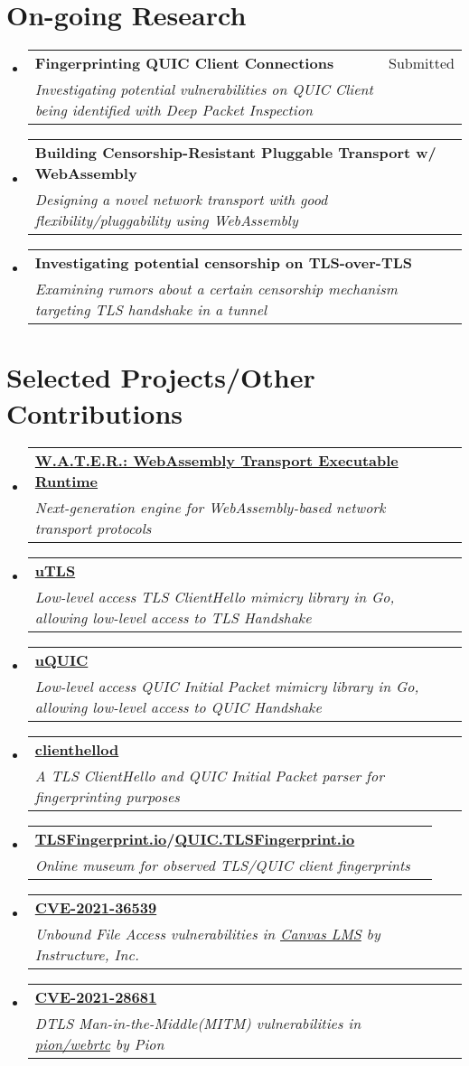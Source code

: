\documentclass[letterpaper,11pt]{article}
\makeatletter
\newcommand{\resumeSubheading}[4]{
  \vspace{-2pt}\item
    \begin{tabular*}{0.97\textwidth}[t]{l@{\extracolsep{\fill}}r}
      \textbf{#1} & #2 \\
      \textit{\small#3} & \textit{\small #4} \\
    \end{tabular*}\vspace{-7pt}
}
\newcommand{\resumeSubHeadingListStart}{\begin{itemize}[leftmargin=0.15in, label={}]}
\newcommand{\resumeSubHeadingListEnd}{\end{itemize}}
\makeatother
\begin{document}
\section{On-going Research}
\resumeSubHeadingListStart
  \resumeSubheading
  {\textbf{Fingerprinting QUIC Client Connections}}{Submitted}
  {Investigating potential vulnerabilities on QUIC Client being identified with Deep Packet Inspection}{}
  \resumeSubheading
  {\textbf{Building Censorship-Resistant Pluggable Transport w/ {WebAssembly}}}{}
  {Designing a novel network transport with good flexibility/pluggability using WebAssembly}{}
  \resumeSubheading
  {\textbf{Investigating potential censorship on TLS-over-TLS}}{}
  {Examining rumors about a certain censorship mechanism targeting TLS handshake in a tunnel}{}
\resumeSubHeadingListEnd
\vspace{1pt}

\section{Selected Projects/Other Contributions}
\resumeSubHeadingListStart
\resumeSubheading
{\href{https://github.com/gaukas/water}{\textbf{W.A.T.E.R.: WebAssembly Transport Executable Runtime}}}{}
{Next-generation engine for WebAssembly-based network transport protocols}{}
\resumeSubheading
{\href{https://github.com/refraction-networking/utls}{\textbf{uTLS}}}{}
{Low-level access TLS ClientHello mimicry library in Go, allowing low-level access to TLS Handshake}{}
\resumeSubheading
{\href{https://github.com/refraction-networking/uquic}{\textbf{uQUIC}}}{}
{Low-level access QUIC Initial Packet mimicry library in Go, allowing low-level access to QUIC Handshake}{}
\resumeSubheading
{\href{https://github.com/gaukas/clienthellod}{\textbf{clienthellod}}}{}
{A TLS ClientHello and QUIC Initial Packet parser for fingerprinting purposes}{}
\resumeSubheading
{\href{https://tlsfingerprint.io}{\textbf{TLSFingerprint.io}}/\href{https://quic.tlsfingerprint.io}{\textbf{QUIC.TLSFingerprint.io}}}{}
{Online museum for observed TLS/QUIC client fingerprints}{}
\resumeSubheading
{\href{https://cve.mitre.org/cgi-bin/cvename.cgi?name=CVE-2021-36539}{\textbf{CVE-2021-36539}}}{}
{Unbound File Access vulnerabilities in \href{https://www.instructure.com/canvas}{Canvas LMS} by \emph{Instructure, Inc.}}{}
\resumeSubheading
{\href{https://cve.mitre.org/cgi-bin/cvename.cgi?name=CVE-2021-28681}{\textbf{CVE-2021-28681}}}{}
{DTLS Man-in-the-Middle(MITM) vulnerabilities in \href{https://github.com/pion/webrtc}{pion/webrtc} by \emph{Pion}}{}
\resumeSubHeadingListEnd
\vspace{1pt}
\end{document}
